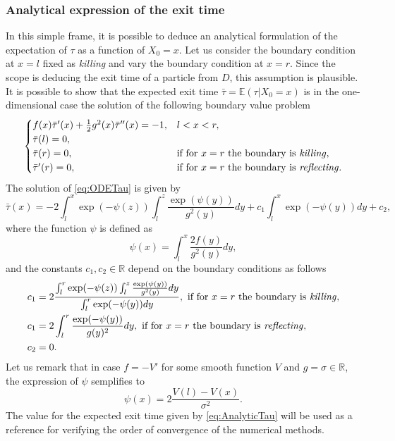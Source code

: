 \subsubsection{Analytical expression of the exit time}
In this simple frame, it is possible to deduce an analytical formulation of the expectation of $\tau$ as a function of $X_0 = x$. Let us consider the boundary condition at $x=l$ fixed as \textit{killing} and vary the boundary condition at $x=r$. Since the scope is deducing the exit time of a particle from $D$, this assumption is plausible. It is possible to show \cite{Krumscheid2015,Pavliotis2014} that the expected exit time $\bar\tau = \mathbb{E}(\tau|X_0 = x)$ is in the one-dimensional case the solution of the following boundary value problem
\begin{equation}\label{eq:ODETau}
\begin{cases}
	f(x)\bar\tau'(x) + \frac{1}{2} g^2(x) \bar\tau''(x) = -1, & l < x < r, \\
	\bar\tau(l) = 0, \\
	\bar\tau(r) = 0, & \text{if for $x = r$ the boundary is \textit{killing}}, \\
	\bar\tau'(r) = 0, & \text{if for $x = r$ the boundary is \textit{reflecting}}. 
\end{cases}
\end{equation}
The solution of \eqref{eq:ODETau} is given by
\begin{equation}\label{eq:AnalyticTau}
	\bar\tau(x) = -2 \int_l^x \exp(-\psi(z)) \int_l^z \frac{\exp(\psi(y))}{g^2(y)}dy + c_1 \int_l^x \exp(-\psi(y))dy + c_2,
\end{equation}
where the function $\psi$ is defined as
\begin{equation}\label{eq:psi}
	\psi(x) = \int_l^x \frac{2f(y)}{g^2(y)}dy,
\end{equation}
and the constants $c_1,c_2 \in \mathbb{R}$ depend on the boundary conditions as follows
\begin{align}\label{eq:Constants}
\begin{split}
	c_1 &= 2\frac{\int_l^r \exp(-\psi(z)) \int_l^z \frac{\exp(\psi(y))}{g^2(y)}dy}{\int_l^r \exp(-\psi(y))dy}, \text{  if for $x = r$ the boundary is \textit{killing}}, \\
	c_1 &= 2\int_l^r \frac{\exp(-\psi(y))}{g(y)^2}dy, \text{  if for $x = r$ the boundary is \textit{reflecting}}, \\
	c_2 &= 0.
\end{split}
\end{align}
Let us remark that in case $f = -V'$ for some smooth function $V$ and $g = \sigma \in \mathbb{R}$, the expression of $\psi$ semplifies to
\begin{equation}\label{eq:psiSemplified}
	\psi(x) = 2\frac{V(l)-V(x)}{\sigma^2}.
\end{equation}
The value for the expected exit time given by \eqref{eq:AnalyticTau} will be used as a reference for verifying the order of convergence of the numerical methods.

